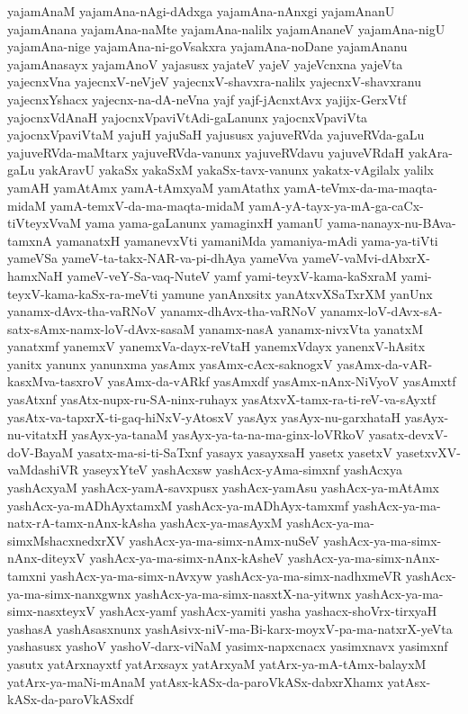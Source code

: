 {yajamAnaM
yajamAna-nAgi-dAdxga
yajamAna-nAnxgi
yajamAnanU
yajamAnana
yajamAna-naMte
yajamAna-nalilx
yajamAnaneV
yajamAna-nigU
yajamAna-nige
yajamAna-ni-goVsakxra
yajamAna-noDane
yajamAnanu
yajamAnasayx
yajamAnoV
yajasusx
yajateV
yajeV
yajeVcnxna
yajeVta
yajecnxVna
yajecnxV-neVjeV
yajecnxV-shavxra-nalilx
yajecnxV-shavxranu
yajecnxYshacx
yajecnx-na-dA-neVna
yajf
yajf-jAcnxtAvx
yajijx-GerxVtf
yajocnxVdAnaH
yajocnxVpaviVtAdi-gaLanunx
yajocnxVpaviVta
yajocnxVpaviVtaM
yajuH
yajuSaH
yajususx
yajuveRVda
yajuveRVda-gaLu
yajuveRVda-maMtarx
yajuveRVda-vanunx
yajuveRVdavu
yajuveVRdaH
yakAra-gaLu
yakAravU
yakaSx
yakaSxM
yakaSx-tavx-vanunx
yakatx-vAgilalx
yalilx
yamAH
yamAtAmx
yamA-tAmxyaM
yamAtathx
yamA-teVmx-da-ma-maqta-midaM
yamA-temxV-da-ma-maqta-midaM
yamA-yA-tayx-ya-mA-ga-caCx-tiVteyxVvaM
yama
yama-gaLanunx
yamaginxH
yamanU
yama-nanayx-nu-BAva-tamxnA
yamanatxH
yamanevxVti
yamaniMda
yamaniya-mAdi
yama-ya-tiVti
yameVSa
yameV-ta-takx-NAR-va-pi-dhAya
yameVva
yameV-vaMvi-dAbxrX-hamxNaH
yameV-veY-Sa-vaq-NuteV
yamf
yami-teyxV-kama-kaSxraM
yami-teyxV-kama-kaSx-ra-meVti
yamune
yanAnxsitx
yanAtxvXSaTxrXM
yanUnx
yanamx-dAvx-tha-vaRNoV
yanamx-dhAvx-tha-vaRNoV
yanamx-loV-dAvx-sA-satx-sAmx-namx-loV-dAvx-sasaM
yanamx-nasA
yanamx-nivxVta
yanatxM
yanatxmf
yanemxV
yanemxVa-dayx-reVtaH
yanemxVdayx
yanenxV-hAsitx
yanitx
yanunx
yanunxma
yasAmx
yasAmx-cAcx-saknogxV
yasAmx-da-vAR-kasxMva-tasxroV
yasAmx-da-vARkf
yasAmxdf
yasAmx-nAnx-NiVyoV
yasAmxtf
yasAtxnf
yasAtx-nupx-ru-SA-ninx-ruhayx
yasAtxvX-tamx-ra-ti-reV-va-sAyxtf
yasAtx-va-tapxrX-ti-gaq-hiNxV-yAtosxV
yasAyx
yasAyx-nu-garxhataH
yasAyx-nu-vitatxH
yasAyx-ya-tanaM
yasAyx-ya-ta-na-ma-ginx-loVRkoV
yasatx-devxV-doV-BayaM
yasatx-ma-si-ti-SaTxnf
yasayx
yasayxsaH
yasetx
yasetxV
yasetxvXV-vaMdashiVR
yaseyxYteV
yashAcxsw
yashAcx-yAma-simxnf
yashAcxya
yashAcxyaM
yashAcx-yamA-savxpusx
yashAcx-yamAsu
yashAcx-ya-mAtAmx
yashAcx-ya-mADhAyxtamxM
yashAcx-ya-mADhAyx-tamxmf
yashAcx-ya-ma-natx-rA-tamx-nAnx-kAsha
yashAcx-ya-masAyxM
yashAcx-ya-ma-simxMshacxnedxrXV
yashAcx-ya-ma-simx-nAmx-nuSeV
yashAcx-ya-ma-simx-nAnx-diteyxV
yashAcx-ya-ma-simx-nAnx-kAsheV
yashAcx-ya-ma-simx-nAnx-tamxni
yashAcx-ya-ma-simx-nAvxyw
yashAcx-ya-ma-simx-nadhxmeVR
yashAcx-ya-ma-simx-nanxgwnx
yashAcx-ya-ma-simx-nasxtX-na-yitwnx
yashAcx-ya-ma-simx-nasxteyxV
yashAcx-yamf
yashAcx-yamiti
yasha
yashacx-shoVrx-tirxyaH
yashasA
yashAsasxnunx
yashAsivx-niV-ma-Bi-karx-moyxV-pa-ma-natxrX-yeVta
yashasusx
yashoV
yashoV-darx-viNaM
yasimx-napxcnacx
yasimxnavx
yasimxnf
yasutx
yatArxnayxtf
yatArxsayx
yatArxyaM
yatArx-ya-mA-tAmx-balayxM
yatArx-ya-maNi-mAnaM
yatAsx-kASx-da-paroVkASx-dabxrXhamx
yatAsx-kASx-da-paroVkASxdf
}
